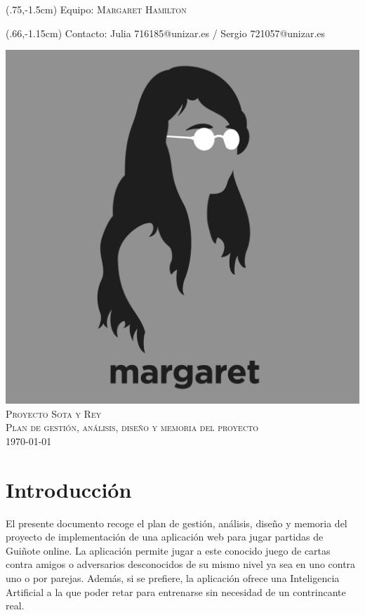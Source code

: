 \documentclass[]{article}
\begin{document}
\begin{titlepage}
	\begin{textblock*}{100mm}(.75\textwidth,-1.5cm)
	Equipo: \textsc{Margaret Hamilton}
    \end{textblock*}
    \begin{textblock*}{100mm}(.66\textwidth,-1.15cm)
    \hspace{-3cm}Contacto:  Julia   716185@unizar.es / Sergio 721057@unizar.es
	\end{textblock*}
    \vfill
	\centering \includegraphics[scale=0.3]{figuras/margaret.png}\\[3em]
    \centering \huge \textsc{Proyecto Sota y Rey}\\[1em]
    \centering \large \textsc{Plan de gestión, análisis, diseño y memoria del proyecto}\\[3em]
    \centering \today
\end{titlepage}

\tableofcontents
\newpage


\section{Introducción}

El presente documento recoge el plan de gestión, análisis, diseño y memoria del proyecto de implementación de una aplicación web para jugar partidas de Guiñote online. La aplicación permite jugar a este conocido juego de cartas contra amigos o adversarios desconocidos de su mismo nivel ya sea en uno contra uno o por parejas. Además, si se prefiere, la aplicación ofrece una Inteligencia Artificial a la que poder retar para entrenarse sin necesidad de un contrincante real.\\
\end{document}

